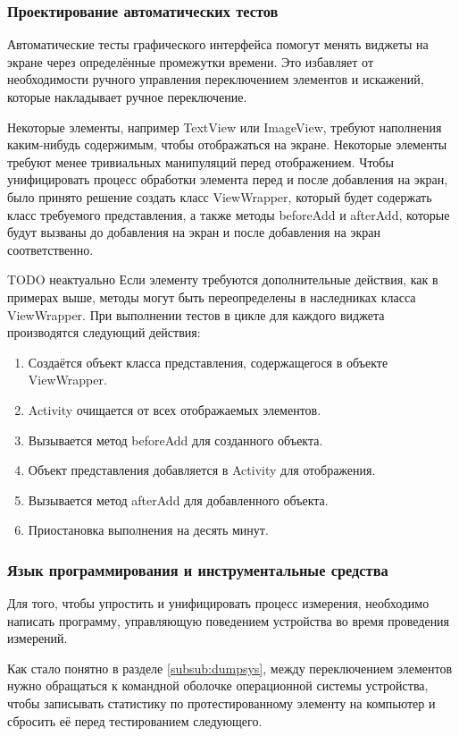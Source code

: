 \documentclass[a4paper,14pt]{extarticle} %
\begin{document}
	\subsubsection{Проектирование автоматических тестов}
	
	Автоматические тесты графического интерфейса помогут менять виджеты на экране через определённые промежутки времени. Это избавляет от необходимости ручного управления переключением элементов и искажений, которые накладывает ручное переключение.
	
	Некоторые элементы, например TextView или ImageView, требуют наполнения каким-нибудь содержимым, чтобы отображаться на экране. Некоторые элементы требуют менее тривиальных манипуляций перед отображением. Чтобы унифицировать процесс обработки элемента перед и после добавления на экран, было принято решение создать класс ViewWrapper, который будет содержать класс требуемого представления, а также методы beforeAdd и afterAdd, которые будут вызваны до добавления на экран и после добавления на экран соответственно. 
	
	{\huge TODO неактуально}
	Если элементу требуются дополнительные действия, как в примерах выше, методы могут быть переопределены в наследниках класса ViewWrapper. При выполнении тестов в цикле для каждого виджета производятся следующий действия:
	\begin{enumerate}
		\item Создаётся объект класса представления, содержащегося в объекте ViewWrapper.
		\item Activity очищается от всех отображаемых элементов.
		\item Вызывается метод beforeAdd для созданного объекта.
		\item Объект представления добавляется в Activity для отображения.
		\item Вызывается метод afterAdd для добавленного объекта.
		\item Приостановка выполнения на десять минут.
	\end{enumerate}
	
	\subsubsection{Язык программирования и  инструментальные средства}
	
	Для того, чтобы упростить и унифицировать процесс измерения, необходимо написать программу, управляющую поведением устройства во время проведения измерений.
	
	Как стало понятно в разделе \ref{subsub:dumpsys}, между переключением элементов нужно обращаться к командной оболочке операционной системы устройства, чтобы записывать статистику по протестированному элементу на компьютер и сбросить её перед тестированием следующего.
	
\end{document}
